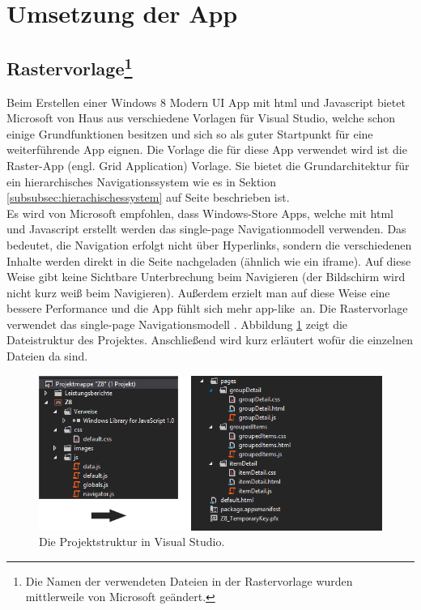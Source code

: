 \documentclass[12pt,a4paper,bibtotoc]{scrartcl}
\begin{document}
\newpage
\section{Umsetzung der App}
\label{sec:umsetzungderapp}

\subsection[Rastervorlage] {Rastervorlage\footnote{Die Namen der verwendeten Dateien in der Rastervorlage wurden mittlerweile von Microsoft geändert.}}
\label{subsec:rastervorlage}
Beim Erstellen einer Windows 8 Modern UI App mit \ac{html} und Javascript bietet Microsoft von Haus aus verschiedene Vorlagen für Visual Studio, welche schon einige Grundfunktionen besitzen und sich so als guter Startpunkt für eine weiterführende App eignen. Die Vorlage die für diese App verwendet wird ist die Raster-App (engl. Grid Application) Vorlage. Sie bietet die Grundarchitektur für ein hierarchisches Navigationssystem wie es in Sektion \ref{subsubsec:hierachischessystem} auf Seite \pageref{subsubsec:hierachischessystem} beschrieben ist.\\
Es wird von Microsoft empfohlen, dass Windows-Store Apps, welche mit \ac{html} und Javascript erstellt werden das single-page Navigationmodell verwenden. Das bedeutet, die Navigation erfolgt nicht über Hyperlinks, sondern die verschiedenen Inhalte werden direkt in die Seite nachgeladen (ähnlich wie ein iframe). Auf diese Weise gibt keine Sichtbare Unterbrechung beim Navigieren (der Bildschirm wird nicht kurz weiß beim Navigieren). Außerdem erzielt man auf diese Weise eine bessere Performance und die App fühlt sich mehr \glqq app-like\grqq\ an. Die Rastervorlage verwendet das single-page Navigationsmodell \citep{MicrosoftSinglePage2013}. Abbildung \ref{fig:projektmappe} zeigt die Dateistruktur des Projektes. Anschließend wird kurz erläutert wofür die einzelnen Dateien da sind.

\begin{figure}[h]
	\centering
	\includegraphics[width=\textwidth]{Bilder/Screenshots/app/projektmappe.png} 
	\caption{Die Projektstruktur in Visual Studio.}
	\label{fig:projektmappe}
\end{figure}
\end{document}
